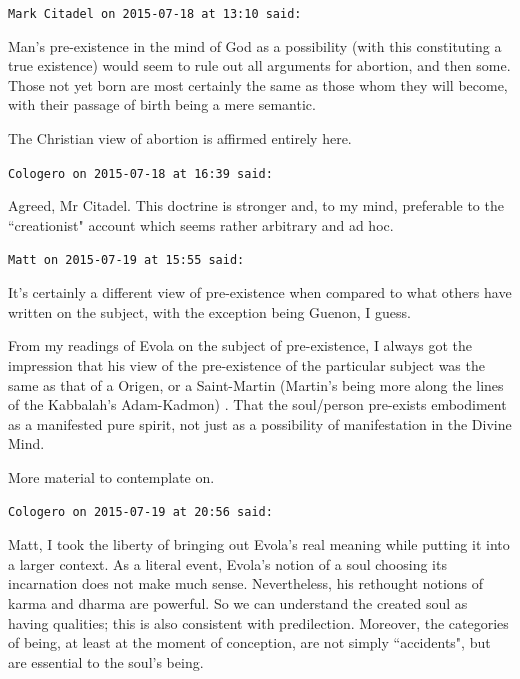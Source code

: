 \begin{footnotesize}\begin{sffamily}



\texttt{Mark Citadel on 2015-07-18 at 13:10 said: }

Man's pre-existence in the mind of God as a possibility (with this constituting a true existence) would seem to rule out all arguments for abortion, and then some. Those not yet born are most certainly the same as those whom they will become, with their passage of birth being a mere semantic.

The Christian view of abortion is affirmed entirely here.


\hfill

\texttt{Cologero on 2015-07-18 at 16:39 said: }

Agreed, Mr Citadel. This doctrine is stronger and, to my mind, preferable to the ``creationist" account which seems rather arbitrary and ad hoc.


\hfill

\texttt{Matt on 2015-07-19 at 15:55 said: }

It's certainly a different view of pre-existence when compared to what others have written on the subject, with the exception being Guenon, I guess.

From my readings of Evola on the subject of pre-existence, I always got the impression that his view of the pre-existence of the particular subject was the same as that of a Origen, or a Saint-Martin (Martin's being more along the lines of the Kabbalah's Adam-Kadmon) . That the soul/person pre-exists embodiment as a manifested pure spirit, not just as a possibility of manifestation in the Divine Mind.

More material to contemplate on.


\hfill


\hfill

\texttt{Cologero on 2015-07-19 at 20:56 said: }

Matt, I took the liberty of bringing out Evola's real meaning while putting it into a larger context. As a literal event, Evola's notion of a soul choosing its incarnation does not make much sense. Nevertheless, his rethought notions of karma and dharma are powerful. So we can understand the created soul as having qualities; this is also consistent with predilection. Moreover, the categories of being, at least at the moment of conception, are not simply ``accidents", but are essential to the soul's being.


\end{sffamily}\end{footnotesize}
